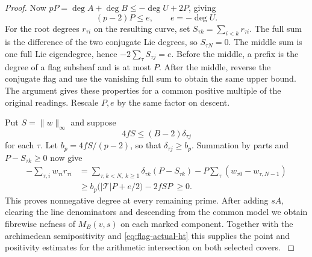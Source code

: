 \begin{proof}
Now \(pP=\deg A+\deg B\le-\deg U+2P\), giving
\[
        (p-2)P\le e,\qquad e=-\deg U .
\]
For the root degrees \(r_{\tau i}\) on the resulting curve, set
\(S_{\tau k}=\sum_{i<k}r_{\tau i}\).
The full sum is the difference of the two conjugate Lie
degrees, so \(S_{\tau N}=0\). The middle sum is one full Lie
eigendegree, hence \(-2\sum_\tau S_{\tau j}=e\). Before the
middle, a prefix is the degree of a flag subsheaf and is at
most \(P\). After the middle, reverse the conjugate flag and
use the vanishing full sum to obtain the same upper bound.
The argument gives these properties for a common positive
multiple of the original readings. Rescale \(P,e\) by the
same factor on descent. \label{cor:flag-wall-positivity-8}

Put \(S=\|w\|_\infty\) and suppose
\[
 4f S\le(B-2)\delta_{\tau j}
\]
for each \(\tau\).
Let \(b_p=4fS/(p-2)\), so that \(\delta_{\tau j}\ge b_p\).
Summation by parts and \(P-S_{\tau k}\ge0\) now give
\[
 \begin{split}
 -\sum_{\tau,i} w_{\tau i}r_{\tau i}
 &=\sum_{\tau,k<N,\ k\ge1}\delta_{\tau k}(P-S_{\tau k})
              -P\sum_\tau(w_{\tau0}-w_{\tau,N-1})\\
 &\ge b_p\bigl(|\mathcal T|P+e/2\bigr)-2fSP\ \ge 0 .
 \end{split}
\]
This proves nonnegative degree at every remaining prime.
After adding \(sA\), clearing the line denominators and descending
from the common model we obtain fibrewise nefness of \(M_B(v,s)\)
on each marked component. Together with the archimedean
semipositivity and \eqref{eq:flag-actual-ht} this supplies the
point and positivity estimates for the arithmetic intersection
on both selected covers. \label{cor:flag-wall-positivity-9}
\end{proof}
